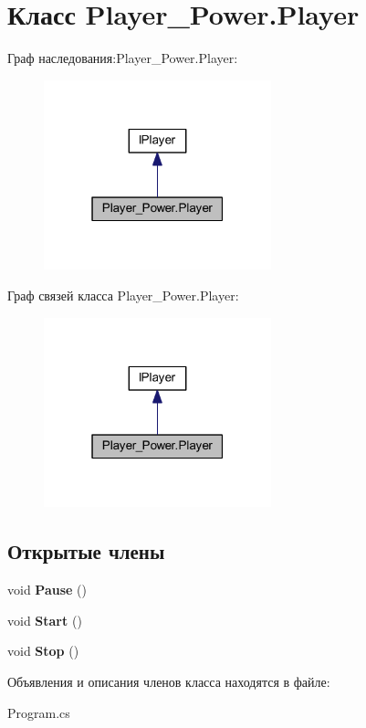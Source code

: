 \section{Класс Player\-\_\-\-Power.\-Player}
\label{class_player___power_1_1_player}


Граф наследования\-:Player\-\_\-\-Power.\-Player\-:
\nopagebreak
\begin{figure}[H]
\begin{center}
\leavevmode
\includegraphics[width=187pt]{class_player___power_1_1_player__inherit__graph}
\end{center}
\end{figure}


Граф связей класса Player\-\_\-\-Power.\-Player\-:
\nopagebreak
\begin{figure}[H]
\begin{center}
\leavevmode
\includegraphics[width=187pt]{class_player___power_1_1_player__coll__graph}
\end{center}
\end{figure}
\subsection*{Открытые члены}
\begin{DoxyCompactItemize}
\item 
void {\bfseries Pause} ()\label{class_player___power_1_1_player_a5536f99c27bd3e8b3c14bad2ac3db63b}

\item 
void {\bfseries Start} ()\label{class_player___power_1_1_player_a2cce62aa8b76d5ea7a097b3d7e6c42a0}

\item 
void {\bfseries Stop} ()\label{class_player___power_1_1_player_aba865811451a1a1d2202c455331cc8aa}

\end{DoxyCompactItemize}


Объявления и описания членов класса находятся в файле\-:\begin{DoxyCompactItemize}
\item 
Program.\-cs\end{DoxyCompactItemize}
